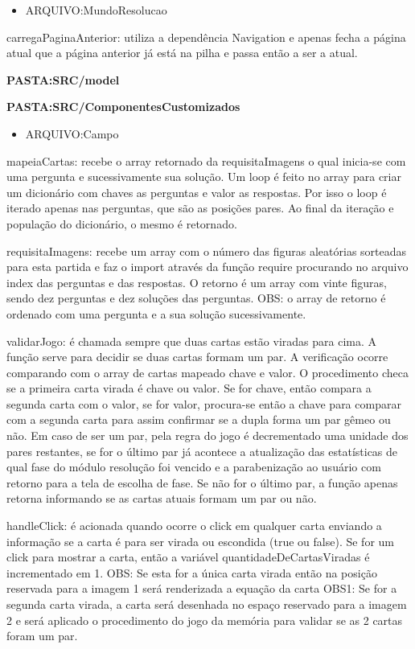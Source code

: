 \begin{itemize}
\item ARQUIVO:MundoResolucao
\end{itemize}
carregaPaginaAnterior: utiliza a dependência Navigation e apenas fecha a página atual que a página anterior já está na pilha e passa então a ser a atual.


\textbf{PASTA:SRC/model}


\textbf{PASTA:SRC/ComponentesCustomizados}
\begin{itemize}
\item ARQUIVO:Campo
\end{itemize}

mapeiaCartas: recebe o array retornado da requisitaImagens o qual inicia-se com uma pergunta e sucessivamente sua solução. Um loop é feito no array para criar um dicionário com chaves as perguntas e valor as respostas. Por isso o loop é iterado apenas nas perguntas, que são as posições pares. Ao final da iteração e população do dicionário, o mesmo é retornado.
	
requisitaImagens: recebe um array com o número das figuras aleatórias sorteadas para esta partida e faz o import através da função require procurando no arquivo index das perguntas e das respostas. O retorno é um array com vinte figuras, sendo dez perguntas e dez soluções das perguntas. OBS: o array de retorno é ordenado com uma pergunta e a sua solução sucessivamente.

validarJogo: é chamada sempre que duas cartas estão viradas para cima. A função serve para decidir se duas cartas formam um par. A verificação ocorre comparando com o array de cartas mapeado chave e valor. O procedimento checa se a primeira carta virada é chave ou valor. Se for chave, então compara a segunda carta com o valor, se for valor, procura-se então a chave para comparar com a segunda carta para assim confirmar se a dupla forma um par gêmeo ou não. Em caso de ser um par, pela regra do jogo é decrementado uma unidade dos pares restantes, se for o último par já acontece a atualização das estatísticas de qual fase do módulo resolução foi vencido e a parabenização ao usuário com retorno para a tela de escolha de fase. Se não for o último par, a função apenas retorna informando se as cartas atuais formam um par ou não.


handleClick: é acionada quando ocorre o click em qualquer carta enviando a informação se a carta é para ser virada ou escondida (true ou false). Se for um click para mostrar a carta, então a variável quantidadeDeCartasViradas é incrementado em 1. 
	OBS: Se esta for a única carta virada então na posição reservada para a imagem 1 será renderizada a equação da carta
	OBS1: Se for a segunda carta virada, a carta será desenhada no espaço reservado para a imagem 2 e será aplicado o procedimento do jogo da memória para validar se as 2 cartas foram um par. 

